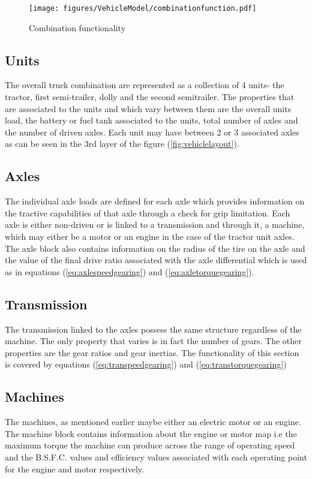 \documentclass[MastersThesis.tex]{subfiles}
\begin{document}
\begin{figure}
	\begin{center}
		\texttt{[image: figures/VehicleModel/combinationfunction.pdf]}
	\end{center}
	\caption{Combination functionality}
	\label{fig:combinationfunction}
\end{figure}

\subsection{Units}\label{sec:unitstructure}
The overall truck combination are represented as a collection of 4 units- the tractor, first semi-trailer, dolly and the second semitrailer. The properties that are associated to the units and which vary between them are the overall units load, the battery or fuel tank associated to the units, total number of axles and the number of driven axles. Each unit may have between 2 or 3 associated axles as can be seen in the 3rd layer of the figure (\ref{fig:vehiclelayout}). 

\subsection{Axles}\label{sec:axlestructure}
The individual axle loads are defined for each axle which provides information on the tractive capabilities of that axle through a check for grip limitation. Each axle is either non-driven or is linked to a transmission and through it, a machine, which may either be a motor or an engine in the case of the tractor unit axles. The axle block also contains information on the radius of the tire on the axle and the value of the final drive ratio associated with the axle differential which is used as in equations (\ref{eq:axlespeedgearing}) and (\ref{eq:axletorquegearing}).

\subsection{Transmission}\label{sec:transtructure}
The transmission linked to the axles possess the same structure regardless of the machine. The only property that varies is in fact the number of gears. The other properties are the gear ratios and gear inertias. The functionality of this section is covered by equations (\ref{eq:transpeedgearing}) and (\ref{eq:transtorquegearing})

\subsection{Machines}\label{sec:machinestructure}
The machines, as mentioned earlier maybe either an electric motor or an engine. The machine block contains information about the engine or motor map i.e the maximum torque the machine can produce across the range of operating speed and the B.S.F.C. values and efficiency values associated with each operating point for the engine and motor respectively.  
\end{document}
